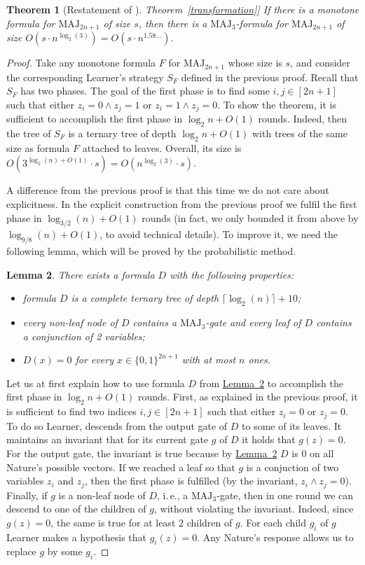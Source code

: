\documentclass[11pt]{article}
\numberwithin{equation}{section}
\newtheorem{theorem}{Theorem}[section]
\newtheorem{lemma}[theorem]{Lemma}
\theoremstyle{definition}
\theoremstyle{plain}
\newcommand{\ie}{i.\,e.}
\newcommand{\expref}[2]{\hyperref[#2]{#1~\ref{#2}}}
\def\MAJ{\mathrm{MAJ}}
\begin{document}
\begin{theorem}[Restatement of \expref{Theorem}{transformation}]
\label{transformation1}
If there is a monotone formula for $\MAJ_{2n + 1}$ of size $s$, then there is a $\MAJ_3$-formula for $\MAJ_{2n + 1}$ of size $O(s \cdot n^{\log_2(3)}) = O(s \cdot n^{1.58\ldots})$.
\end{theorem}
\begin{proof}
Take any monotone formula $F$ for $\MAJ_{2n + 1}$ whose size is $s$, and consider the corresponding Learner's strategy $S_F$ defined in the previous proof. Recall that $S_F$ has two phases. The goal of the first phase is to find some $i, j\in[2n + 1]$ such that either $z_i = 0\land z_j = 1$ or $z_i = 1\land z_j = 0$. To show the theorem, it is sufficient to accomplish the first phase in $\log_2 n + O(1)$ rounds. Indeed, then the tree of $S_F$ is a ternary tree of depth $\log_2 n  + O(1)$ with trees of the same size as formula $F$ attached to leaves. Overall, its size is $O(3^{\log_2(n) + O(1)} \cdot s) = O(n^{\log_2(3)} \cdot s)$. 

A difference from the previous proof is that this time we do not care about explicitness. In the explicit construction from the previous proof we fulfil the first phase in $\log_{3/2}(n) + O(1)$ rounds (in fact, we only bounded it from above by $\log_{9/8}(n) + O(1)$, to avoid technical details). To improve it, 
we need the following lemma, which will be proved by the probabilistic method.


\begin{lemma}
\label{valiant_lemma}
There exists a formula $D$ with the following properties:
\begin{itemize}
\item formula $D$ is a complete ternary tree of depth $\lceil\log_2(n)\rceil + 10$;
\item every non-leaf node of $D$ contains a $\MAJ_3$-gate and every leaf of $D$ contains a conjunction of 2 variables;
\item $D(x) = 0$ for every $x\in \{0, 1\}^{2n + 1}$ with at most $n$ ones.
\end{itemize}
\end{lemma}
Let us at first explain how to use formula $D$ from \expref{Lemma}{valiant_lemma} to accomplish the first phase in $\log_2 n + O(1)$ rounds. First, as explained in the previous proof, it is sufficient to find two indices $i, j\in[2n + 1]$ such that either $z_i = 0$ or $z_j = 0$. To do so Learner, descends from the output gate of $D$ to some of its leaves. It %
 maintains an invariant that for its %
 current gate $g$ of $D$ it holds that $g(z) = 0$.  
For the output gate, the invariant is true because by \expref{Lemma}{valiant_lemma} $D$ is $0$ on all Nature's possible vectors. If we reached a leaf so that $g$ is a conjuction of two variables $z_i$ and $z_j$, then the first phase is fulfilled (by the invariant, $z_i\land z_j = 0$). Finally, if $g$ is a non-leaf node of $D$, \ie, a $\MAJ_3$-gate, then in one round we can descend to one of the children of $g$, without violating the invariant. Indeed, since $g(z) = 0$, the same is true for at least $2$ children of $g$. For each child $g_i$ of $g$ Learner makes a hypothesis that $g_i(z) = 0$. Any Nature's response allows us to replace $g$ by some $g_i$. 


\end{proof}
\end{document}
